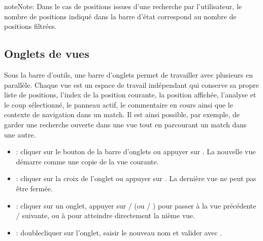 \documentclass[letterpaper,10pt,french]{sphinxmanual}
\begin{document}
\begin{sphinxadmonition}{note}{Note:}
\sphinxAtStartPar
Dans le cas de positions issues d’une recherche par l’utilisateur, le
nombre de positions indiqué dans la barre d’état correspond au nombre de
positions filtrées.
\end{sphinxadmonition}


\subsection{Onglets de vues}
\label{\detokenize{manuel:onglets-de-vues}}\label{\detokenize{manuel:onglets-vues}}
\sphinxAtStartPar
Sous la barre d’outils, une barre d’onglets permet de travailler avec
plusieurs  en parallèle. Chaque vue est un espace de travail
indépendant qui conserve sa propre liste de positions, l’index de la position
courante, la position affichée, l’analyse et le coup sélectionné, le panneau
actif, le commentaire en cours ainsi que le contexte de navigation dans un
match. Il est ainsi possible, par exemple, de garder une recherche ouverte
dans une vue tout en parcourant un match dans une autre.
\begin{itemize}
\item {} 
\sphinxAtStartPar
{} : cliquer sur le bouton \sphinxstyleemphasis{+} de la barre d’onglets ou
appuyer sur . La nouvelle vue démarre comme une copie de la vue
courante.

\item {} 
\sphinxAtStartPar
{} : cliquer sur la croix de l’onglet ou appuyer sur
. La dernière vue ne peut pas être fermée.

\item {} 
\sphinxAtStartPar
{} : cliquer sur un onglet, appuyer sur  /
 (ou  / ) pour passer à la vue précédente /
suivante, ou  à  pour atteindre directement la n\sphinxhyphen{}ième vue.

\item {} 
\sphinxAtStartPar
{} : double\sphinxhyphen{}cliquer sur l’onglet, saisir le nouveau nom
et valider avec .

\end{itemize}
\end{document}
